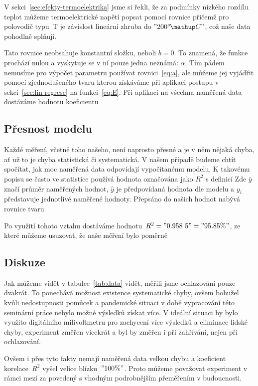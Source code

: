 V sekci~\ref{sec:efekty-termoelektrika} jsme si řekli, že za podmínky nízkého
rozdílu teplot můžeme termoelektrické napětí popsat pomocí rovnice
přičemž pro polovodič typu~T je závislost lineární zhruba do $"200 \C"$, což
naše data pohodlně splňují.~\cite{thermocoupleinfo}

Tato rovnice neobsahuje konstantní složku, neboli $b=0$. To znamená, že funkce
prochází nulou a vyskytuje se v ní pouze jedna neznámá: $\alpha$. Tím pádem
nemusíme pro výpočet parametru používat rovnici~\eqref{eq:a}, ale můžeme jej
vyjádřit pomocí zjednodušeného tvaru
kterou získáváme při aplikaci postupu v sekci~\ref{sec:lin-regrese} na 
funkci~\eqref{eq:E}. Při aplikaci na všechna naměřená data dostáváme hodnotu
koeficientu

\subsection{Přesnost modelu}
Každé měření, včetně toho našeho, není naprosto přesné a je v něm nějaká chyba,
ať už to je chyba statistická či systematická. V našem případě budeme chtít 
spočítat, jak moc naměřená data odpovídají vypočítanému modelu. K takovému
popisu se často ve statistice používá hodnota označována jako $R^2$ s definicí
Zde $\bar y$ značí průměr naměřených hodnot, $\hat y$ je předpovídaná hodnota
dle modelu a $y_i$ představuje jednotlivé naměřené hodnoty. Přepsáno do našich
hodnot nabývá rovnice tvaru

Po využití tohoto vztahu dostáváme hodnotu~$R^2 = "0.958~5" = "95.85 \%"$, ze
které můžeme usuzovat, že naše měření bylo poměrně

\subsection{Diskuze}
Jak můžeme vidět v tabulce~\ref{tab:data} vidět, měřili jsme ochlazování pouze
dvakrát. To ponechává možnost existence systematické chyby, ovšem bohužel kvůli
nedostupnosti pomůcek a pandemické situaci v době vypracování této seminární
práce nebylo možné výsledků získat více. V ideální situaci by bylo využito
digitálního milivoltmetru pro zachycení více výsledků a eliminace lidské chyby,
experiment změřen vícekrát a byl by změřen i při zahřívání, nejen při
ochlazování.

Ovšem i přes tyto fakty nemají naměřená data velkou chybu a koeficient korelace~$R^2$
vyšel velice blízku~$"100 \%"$. Proto můžeme považovat experiment v rámci mezí
za povedený s vhodným podrobnějším přeměřením v budoucnosti.
